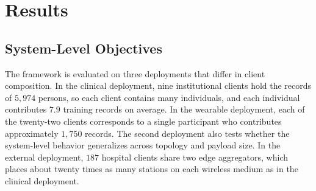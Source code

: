 %
%

\section{Results}
\label{sec:results}

\subsection{System-Level Objectives}
\label{sec:results:objectives}

The framework is evaluated on three deployments that differ in client
composition. In the clinical deployment, nine institutional clients hold the
records of $5{,}974$ persons, so each client contains many individuals, and
each individual contributes $7.9$ training records on average. In the wearable
deployment, each of the twenty-two clients corresponds to a single participant
who contributes approximately $1{,}750$ records. The second deployment also
tests whether the system-level behavior generalizes across topology and payload
size. In the external deployment, $187$ hospital clients share two edge
aggregators, which places about twenty times as many stations on each wireless
medium as in the clinical deployment.

